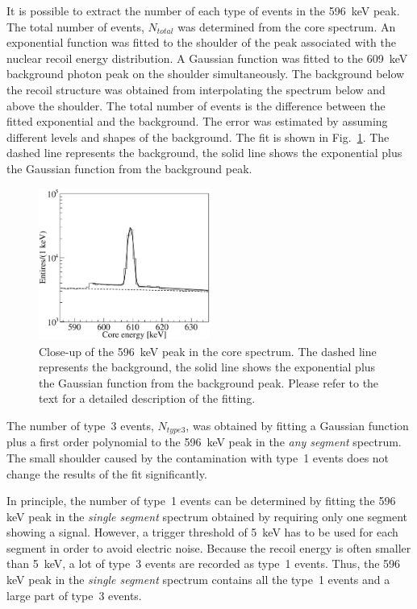 It is possible to extract the number of each type of events in the 596~keV peak. The total number of events, $N_{total}$ was determined from the core spectrum. An exponential function was fitted to the shoulder of the peak associated with the nuclear recoil energy distribution. A Gaussian function was fitted to the 609~keV background photon peak on the shoulder simultaneously. The background below the recoil structure was obtained from interpolating the spectrum below and above the shoulder. The total number of events is the difference between the fitted exponential and the background. The error was estimated by assuming different levels and shapes of the background. The fit is shown in Fig.~\ref{fig:neu:f596}. The dashed line represents the background, the solid line shows the exponential plus the Gaussian function from the background peak.

\begin{figure}[tbhp]
  \centering
  \includegraphics[width=0.5\textwidth]{fit596}
  \caption{Close-up of the 596~keV peak in the core spectrum. The     dashed line represents the background, the solid line shows the     exponential plus the Gaussian function from the background peak.     Please refer to the text for a detailed description of the     fitting.}
  \label{fig:neu:f596}
\end{figure}

The number of type~3 events, $N_{type3}$, was obtained by fitting a
Gaussian function plus a first order polynomial to the 596~keV peak in
the \emph{any segment} spectrum. The small shoulder caused by the
contamination with type~1 events does not change the results of the
fit significantly.

In principle, the number of type~1 events can be determined by fitting the 596 keV peak in the \emph{single segment} spectrum obtained by requiring only one segment showing a signal. However, a trigger threshold of 5~keV has to be used for each segment in order to avoid electric noise. Because the recoil energy is often smaller than 5~keV, a lot of type~3 events are recorded as type~1 events. Thus, the 596 keV peak in the \emph{single segment} spectrum contains all the type~1 events and a large part of type~3 events.

